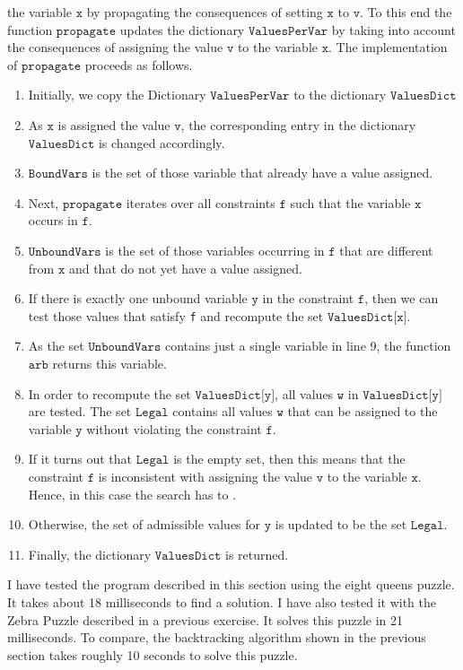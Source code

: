 the variable $\texttt{x}$  by propagating the consequences of setting $\texttt{x}$ to $\texttt{v}$.  To this end
the function $\texttt{propagate}$ updates the dictionary $\texttt{ValuesPerVar}$ by taking into account the
consequences of assigning the value $\texttt{v}$ to the variable $\texttt{x}$.  The implementation of
$\texttt{propagate}$ proceeds as follows.
\begin{enumerate}
\item Initially, we copy the Dictionary $\texttt{ValuesPerVar}$ to the dictionary
      $\mathtt{ValuesDict}$
\item As $\texttt{x}$ is assigned the value $\texttt{v}$, the corresponding entry in the dictionary
      $\texttt{ValuesDict}$ is changed accordingly. 
\item $\texttt{BoundVars}$ is the set of those variable that already have a value assigned.
\item Next, $\texttt{propagate}$ iterates over all  constraints $\texttt{f}$ such that the variable
      $\texttt{x}$ occurs in $\texttt{f}$.
\item $\texttt{UnboundVars}$ is the set of those variables occurring in $\texttt{f}$ that are different from
      $\texttt{x}$ and that do not yet have a value assigned.  
\item If there is exactly one unbound variable $\texttt{y}$ in the constraint $\texttt{f}$, then we can test
      those values that satisfy \texttt{f} and recompute the set $\texttt{ValuesDict[x]}$.
\item As the set $\texttt{UnboundVars}$ contains just a single variable in line 9,
      the function $\texttt{arb}$ returns this variable.
\item In order to recompute the set $\texttt{ValuesDict[y]}$,  all values $\texttt{w}$ in
      $\texttt{ValuesDict[y]}$ are tested.  The set $\texttt{Legal}$ contains all values $\texttt{w}$ that can
      be assigned to the variable $\texttt{y}$ without violating the constraint $\texttt{f}$.
\item If it turns out that $\texttt{Legal}$ is the empty set, then this means that the constraint
      $\texttt{f}$ is inconsistent with assigning the value $\texttt{v}$ to the variable
      $\texttt{x}$.  Hence, in this case the  search has to  .
\item Otherwise, the set of admissible values for $\texttt{y}$ is updated to be the set $\texttt{Legal}$.
\item Finally, the dictionary $\texttt{ValuesDict}$ is returned.
\end{enumerate}
I have tested the program described in this section using the eight queens puzzle.  It takes about
18 milliseconds to find a solution.  I have also tested
it with the Zebra Puzzle described in a previous exercise.  It solves this puzzle in 21 milliseconds.  To
compare, the backtracking algorithm shown in the previous section takes roughly 10 seconds to solve this
puzzle.

